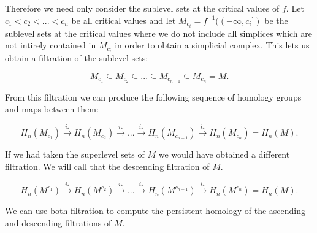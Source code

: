 Therefore we need only consider the sublevel sets at the critical values of $f$. Let $c_1 < c_2 < ... < c_n$ be all critical values and let $M_{c_i} = f^{-1}((-\infty, c_i])$ be the sublevel sets at the critical values where we do not include all simplices which are not intirely contained in $M_{c_i}$ in order to obtain a simplicial complex. This lets us obtain a filtration of the sublevel sets:

$$ M_{c_1} \subseteq M_{c_2} \subseteq ... \subseteq M_{c_{n-1}} \subseteq M_{c_n} = M.$$

From this filtration we can produce the following sequence of homology groups and maps between them:

$$ H_n(M_{c_1}) \overset{i_*}{\longrightarrow} H_n(M_{c_2}) \overset{i_*}{\longrightarrow} ... \overset{i_*}{\longrightarrow} H_n(M_{c_{n-1}}) \overset{i_*}{\longrightarrow} H_n(M_{c_n}) = H_n(M).$$

If we had taken the superlevel sets of $M$ we would have obtained a different filtration. We will call that the descending filtration of $M$.

$$ H_n(M^{c_1}) \overset{i_*}{\longrightarrow} H_n(M^{c _2}) \overset{i_*}{\longrightarrow} ... \overset{i_*}{\longrightarrow} H_n(M^{c_{n-1}}) \overset{i_*}{\longrightarrow} H_n(M^{c_n}) = H_n(M).$$

We can use both filtration to compute the persistent homology of the ascending and descending filtrations of $M$.


%


